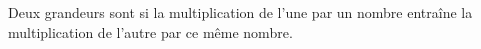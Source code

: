 Deux grandeurs sont  si la multiplication de l'une par un
nombre entraîne la multiplication de l'autre par ce même nombre.